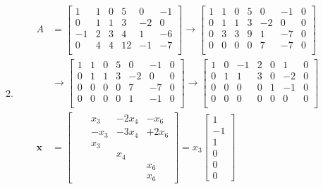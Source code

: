 \documentclass[letterpaper]{article}
\begin{document}
\begin{enumerate}
\begin{enumerate}
\begin{align*}
  \end{align*}
  \setcounter{enumii}{7}
  \item
  \begin{align*}
    A&=
    \left[\begin{array}{cccccc}
      1&1&0&5&0&-1\\
      0&1&1&3&-2&0\\
      -1&2&3&4&1&-6\\
      0&4&4&12&-1&-7\\
    \end{array}\right]
    \to
    \left[\begin{array}{cccccc|c}
      1&1&0&5&0&-1&0\\
      0&1&1&3&-2&0&0\\
      0&3&3&9&1&-7&0\\
      0&0&0&0&7&-7&0\\
    \end{array}\right]\\
    &\to
    \left[\begin{array}{cccccc|c}
      1&1&0&5&0&-1&0\\
      0&1&1&3&-2&0&0\\
      0&0&0&0&7&-7&0\\
      0&0&0&0&1&-1&0\\
    \end{array}\right]
    \to
    \left[\begin{array}{cccccc|c}
      1&0&-1&2&0&1&0\\
      0&1&1&3&0&-2&0\\
      0&0&0&0&1&-1&0\\
      0&0&0&0&0&0&0\\
    \end{array}\right]\\
    \mathbf{x}&=\left[\begin{array}{ccccc}
    &&x_3&-2x_4&-x_6\\
    &&-x_3&-3x_4&+2x_6\\
    &&x_3\\
    &&&x_4\\
    &&&&x_6\\
    &&&&x_6
    \end{array}\right]
    =x_3\left[\begin{array}{c}1\\-1\\1\\0\\0\\0\end{array}\right]

\end{align*}
\end{enumerate}
\end{enumerate}
\end{document}
